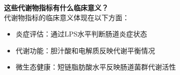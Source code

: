 \documentclass[UTF8]{ctexart}
\begin{document}
\begin{tcolorbox}[
    enhanced,
    colback=lightpurple!10, %
    colframe=white,  %
    arc=3mm,
    boxrule=0.5pt,
    width=\textwidth,
    top=8pt,
    bottom=8pt
]
{\small{\color{lightpurple}\faQuestionCircle}\quad \textbf{这些代谢物指标有什么临床意义？}\\
{\color{orange!50}\faComments}\quad 代谢物指标的临床意义体现在以下方面：
\begin{itemize}[]
    \item 炎症评估：通过LPS水平判断肠道炎症状态
    \item 代谢功能：胆汁酸和电解质反映代谢平衡情况
    \item 微生态健康：短链脂肪酸水平反映肠道菌群代谢活性
\end{itemize}
}
\end{tcolorbox}

\vspace{-0.5cm}
\end{document}

